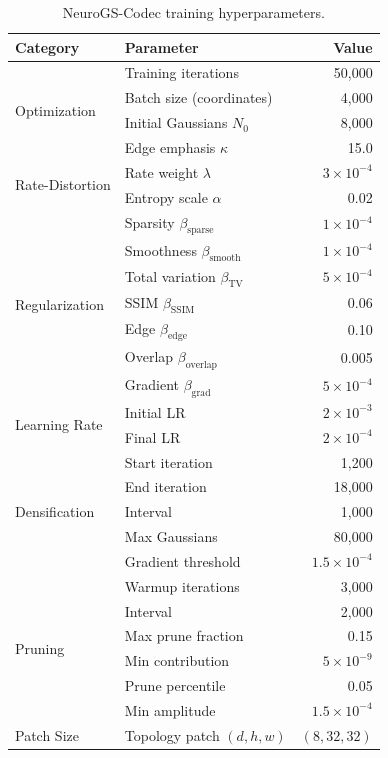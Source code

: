\documentclass[11pt,a4paper]{article}
\begin{document}
\begin{table}[htbp]
\centering
\caption{NeuroGS-Codec training hyperparameters.}
\label{tab:hyperparams}
\small
\begin{tabular}{llr}
\toprule
\textbf{Category} & \textbf{Parameter} & \textbf{Value} \\
\midrule
\multirow{4}{*}{Optimization} 
    & Training iterations & 50,000 \\
    & Batch size (coordinates) & 4,000 \\
    & Initial Gaussians $N_0$ & 8,000 \\
    & Edge emphasis $\kappa$ & 15.0 \\
\midrule
\multirow{2}{*}{Rate-Distortion}
    & Rate weight $\lambda$ & $3 \times 10^{-4}$ \\
    & Entropy scale $\alpha$ & 0.02 \\
\midrule
\multirow{7}{*}{Regularization}
    & Sparsity $\beta_{\text{sparse}}$ & $1 \times 10^{-4}$ \\
    & Smoothness $\beta_{\text{smooth}}$ & $1 \times 10^{-4}$ \\
    & Total variation $\beta_{\text{TV}}$ & $5 \times 10^{-4}$ \\
    & SSIM $\beta_{\text{SSIM}}$ & 0.06 \\
    & Edge $\beta_{\text{edge}}$ & 0.10 \\
    & Overlap $\beta_{\text{overlap}}$ & 0.005 \\
    & Gradient $\beta_{\text{grad}}$ & $5 \times 10^{-4}$ \\
\midrule
\multirow{2}{*}{Learning Rate}
    & Initial LR & $2 \times 10^{-3}$ \\
    & Final LR & $2 \times 10^{-4}$ \\
\midrule
\multirow{5}{*}{Densification}
    & Start iteration & 1,200 \\
    & End iteration & 18,000 \\
    & Interval & 1,000 \\
    & Max Gaussians & 80,000 \\
    & Gradient threshold & $1.5 \times 10^{-4}$ \\
\midrule
\multirow{6}{*}{Pruning}
    & Warmup iterations & 3,000 \\
    & Interval & 2,000 \\
    & Max prune fraction & 0.15 \\
    & Min contribution & $5 \times 10^{-9}$ \\
    & Prune percentile & 0.05 \\
    & Min amplitude & $1.5 \times 10^{-4}$ \\
\midrule
Patch Size & Topology patch $(d, h, w)$ & $(8, 32, 32)$ \\
\bottomrule
\end{tabular}
\end{table}
\end{document}
